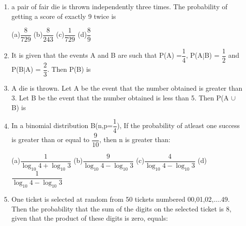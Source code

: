 \documentclass[journal,12pt,twocolumn]{IEEEtran}
\begin{document}
\begin{enumerate}[label=\arabic*]
	\begin{multicols}{4}
	(a)0.2 (b)0.7 (c)0.06  (d)0.14
	\end{multicols}
	\item a pair of fair die is thrown independently three times. The probability of getting a score of exactly 9 twice is 
	\begin{multicols}{4}
	(a)$\dfrac{8}{729}$  (b)$\dfrac{8}{243}$  (c)$\dfrac{1}{729}$  (d)$\dfrac{8}{9}$
	\end{multicols}
	\item It is given that the events A and B are such that P(A) =$\dfrac{1}{4}$, P(A$|$B) = $\dfrac{1}{2}$ and P(B$|$A) = $\dfrac{2}{3}$. Then P(B) is
	\begin{itemize}
	\begin{multicols}{4}
	\item[(a)]$\dfrac{1}{6}$  \item[(b)]$\dfrac{1}{3}$  \item[(c)]$\dfrac{2}{3}$  \item[(d)]$\dfrac{1}{2}$
	\end{multicols}
	\end{itemize}
	\item A die is thrown. Let A be the event that the number obtained is greater than 3. Let B be the event that the number obtained is less than 5. Then P(A $\cup$ B) is
	\begin{itemize}
	\begin{multicols}{4}
	\item[(a)]$\dfrac{3}{5}$  \item[(b)]0  \item[(c)]1  \item[(d)]$\dfrac{2}{5}$
	\end{multicols}
	\end{itemize}
	\item In a binomial distribution B(n,p=$\dfrac{1}{4}$), If the probability of atleast one success is greater than or equal to $\dfrac{9}{10}$,  then n is greater than:
	\begin{multicols}{2}
	(a)$\dfrac{1}{\log_{10}4+\log_{10}3}$   (b)$\dfrac{9}{\log_{10}4-\log_{10}3}$ (c)$\dfrac{4}{\log_{10}4-\log_{10}3}$   (d)$\dfrac{1}{\log_{10}4-\log_{10}3}$
	\end{multicols}
	\item One ticket is selected at random from 50 tickets numbered 00,01,02,....49.  Then the probability that the sum of the digits on the selected ticket is 8, given that the product of these digits is zero, equals:

\end{enumerate}
\end{document}
